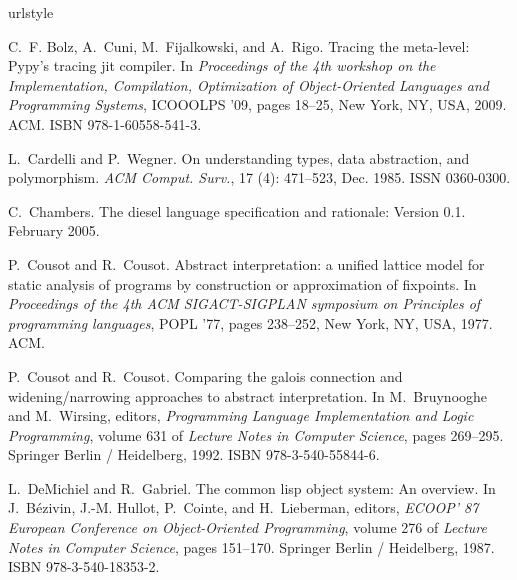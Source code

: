 \documentclass[9pt]{sigplanconf}
\begin{document}
\begin{thebibliography}{16}
\softraggedright

\providecommand{\natexlab}[1]{#1}
\providecommand{\url}[1]{\texttt{#1}}
\expandafter\ifx\csname urlstyle\endcsname\relax
  \providecommand{\doi}[1]{doi: #1}\else
  \providecommand{\doi}{doi: \begingroup \urlstyle{rm}\Url}\fi

C.~F. Bolz, A.~Cuni, M.~Fijalkowski, and A.~Rigo.
\newblock Tracing the meta-level: Pypy's tracing jit compiler.
\newblock In \emph{Proceedings of the 4th workshop on the Implementation,
  Compilation, Optimization of Object-Oriented Languages and Programming
  Systems}, ICOOOLPS '09, pages 18--25, New York, NY, USA, 2009. ACM.
\newblock ISBN 978-1-60558-541-3.

L.~Cardelli and P.~Wegner.
\newblock On understanding types, data abstraction, and polymorphism.
\newblock \emph{ACM Comput. Surv.}, 17 (4): 471--523, Dec.
  1985.
\newblock ISSN 0360-0300.

C.~Chambers.
\newblock The diesel language specification and rationale: Version 0.1.
\newblock February 2005.

P.~Cousot and R.~Cousot.
\newblock Abstract interpretation: a unified lattice model for static analysis
  of programs by construction or approximation of fixpoints.
\newblock In \emph{Proceedings of the 4th ACM SIGACT-SIGPLAN symposium on
  Principles of programming languages}, POPL '77, pages 238--252, New York, NY,
  USA, 1977. ACM.

P.~Cousot and R.~Cousot.
\newblock Comparing the galois connection and widening/narrowing approaches to
  abstract interpretation.
\newblock In M.~Bruynooghe and M.~Wirsing, editors, \emph{Programming Language
  Implementation and Logic Programming}, volume 631 of \emph{Lecture Notes in
  Computer Science}, pages 269--295. Springer Berlin / Heidelberg, 1992.
\newblock ISBN 978-3-540-55844-6.

L.~DeMichiel and R.~Gabriel.
\newblock The common lisp object system: An overview.
\newblock In J.~Bézivin, J.-M. Hullot, P.~Cointe, and H.~Lieberman, editors,
  \emph{ECOOP’ 87 European Conference on Object-Oriented Programming}, volume
  276 of \emph{Lecture Notes in Computer Science}, pages 151--170. Springer
  Berlin / Heidelberg, 1987.
\newblock ISBN 978-3-540-18353-2.


\end{thebibliography}
\end{document}
